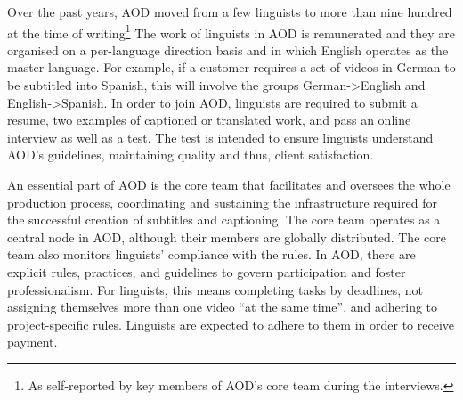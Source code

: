 Over the past years, AOD moved from a few linguists to more than nine hundred at the time of writing\footnote{As self-reported by key members of AOD's core team during the interviews.} The work of linguists in AOD is remunerated and they are organised on a per-language direction basis and in which English operates as the master language. For example, if a customer requires a set of videos in German to be subtitled into Spanish, this will involve the groups German->English and English->Spanish. In order to join AOD, linguists are required to submit a resume, two examples of captioned or translated work, and pass an online interview as well as a test. The test is intended to ensure linguists understand AOD's guidelines, maintaining quality and thus, client satisfaction.

An essential part of AOD is the core team that facilitates and oversees the whole production process, coordinating and sustaining the infrastructure required for the successful creation of subtitles and captioning. The core team operates as a central node in AOD, although their members are globally distributed. The core team also monitors linguists' compliance with the rules. In AOD, there are explicit rules, practices, and guidelines to govern participation and foster professionalism. For linguists, this means completing tasks by deadlines, not assigning themselves more than one video ``at the same time'', and adhering to project-specific rules. Linguists are expected to adhere to them in order to receive payment.